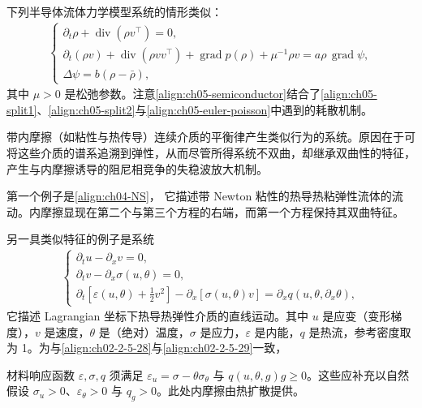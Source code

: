 \documentclass[../../main.tex]{subfiles}
\begin{document}
下列半导体流体力学模型系统的情形类似：
\begin{align}
\begin{cases}
\partial_{t}\rho+\operatorname{div}(\rho v^{\top})=0,\\
\partial_{t}(\rho v)+\operatorname{div}(\rho vv^{\top})+\operatorname{grad}p(\rho)+\mu^{-1}\rho v=a\rho\,\operatorname{grad}\psi,\\
\Delta\psi=b(\rho-\bar{\rho}),
\end{cases}\label{align:ch05-semiconductor}
\end{align}
其中 $\mu>0$ 是松弛参数。注意\eqref{align:ch05-semiconductor}结合了\eqref{align:ch05-split1}、\eqref{align:ch05-split2}与\eqref{align:ch05-euler-poisson}中遇到的耗散机制。

带内摩擦（如粘性与热传导）连续介质的平衡律产生类似行为的系统。原因在于可将这些介质的谱系追溯到弹性，从而尽管所得系统不双曲，却继承双曲性的特征，产生与内摩擦诱导的阻尼相竞争的失稳波放大机制。

第一个例子是\eqref{align:ch04-NS}，
它描述带 Newton 粘性的热导热粘弹性流体的流动。内摩擦显现在第二个与第三个方程的右端，而第一个方程保持其双曲特征。

另一具类似特征的例子是系统
\begin{align}
\begin{cases}
\partial_{t}u-\partial_{x}v=0,\\
\partial_{t}v-\partial_{x}\sigma(u,\theta)=0,\\
\partial_{t}[\varepsilon(u,\theta)+\frac{1}{2}v^{2}]-\partial_{x}[\sigma(u,\theta)v]=\partial_{x}q(u,\theta,\partial_{x}\theta),
\end{cases}\label{align:ch05-thermoelastic}
\end{align}
它描述 Lagrangian 坐标下热导热弹性介质的直线运动。其中 $u$ 是应变（变形梯度），$v$ 是速度，$\theta$ 是（绝对）温度，$\sigma$ 是应力，$\varepsilon$ 是内能，$q$ 是热流，参考密度取为 1。为与\eqref{align:ch02-2-5-28}与\eqref{align:ch02-2-5-29}一致，

材料响应函数 $\varepsilon,\sigma,q$ 须满足 $\varepsilon_{u}=\sigma-\theta\sigma_{\theta}$ 与 $q(u,\theta,g)g\geqslant0$。这些应补充以自然假设 $\sigma_{u}>0$、$\varepsilon_{\theta}>0$ 与 $q_{g}>0$。此处内摩擦由热扩散提供。
\end{document}
